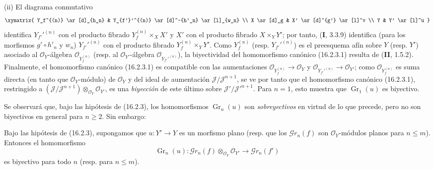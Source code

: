 \noindent(ii) El diagrama conmutativo
\[
  \xymatrix{
    Y_f^{(n)} \ar[d]_{h_n}
      & Y_{f'}'^{(n)} \ar[d]^-{h'_n} \ar[l]_{w_n} \\
    X \ar[d]_g
      & X' \ar[d]^{g'} \ar[l]^v \\
    Y
      & Y' \ar[l]^u
  }
\]
identifica $Y_{f'}'^{(n)}$ con el producto fibrado $Y_f^{(n)}\times_X X'$ y $X'$ con el producto fibrado
$X\times_Y Y'$; por tanto, (\textbf I, 3.3.9) identifica (para los morfismos
$g'\circ h'_n$ y $w_n$) $Y_{f'}'^{(n)}$ con el producto fibrado
$Y_f^{(n)}\times_Y Y'$. Como $Y_f^{(n)}$ (resp. $Y_{f'}'^{(n)}$) es el
preesquema afín sobre $Y$ (resp. $Y'$) asociado al
$\mathcal{O}_Y$-álgebra $\mathcal{O}_{Y_f^{(n)}}$ (resp. al
$\mathcal{O}_{Y'}$-álgebra $\mathcal{O}_{Y_{f'}'^{(n)}}$), la biyectividad del
homomorfismo canónico (16.2.3.1) resulta de (\textbf{II}, 1.5.2).
Finalmente, el homomorfismo canónico (16.2.3.1) es compatible con las
aumentaciones
$\mathcal{O}_{Y_f^{(n)}}\to\mathcal{O}_Y$ y
$\mathcal{O}_{Y_{f'}'^{(n)}}\to\mathcal{O}_{Y'}$; como
$\mathcal{O}_{Y_f^{(n)}}$ es suma directa (en tanto que
$\mathcal{O}_Y$-módulo) de $\mathcal{O}_Y$ y del ideal de aumentación
$\mathscr{J}/\mathscr{J}^{n+1}$, se ve por tanto que el homomorfismo canónico
(16.2.3.1), restringido a
$(\mathscr{J}/\mathscr{J}^{n+1})\otimes_{\mathcal{O}_Y}\mathcal{O}_{Y'}$,
es una \emph{biyección} de este último sobre
$\mathscr{J}'/\mathscr{J}'^{n+1}$. Para $n=1$, esto muestra que
$\operatorname{Gr}_1(u)$ es biyectivo.

Se observará que, bajo las hipótesis de (16.2.3), los homomorfismos
$\operatorname{Gr}_n(u)$ son \emph{sobreyectivos} en virtud de lo que precede, pero no
son biyectivos en general para $n\geq 2$. Sin embargo:

\begin{corollary}[16.2.4]
\label{IV.16.2.4}
Bajo las hipótesis de \textup{(16.2.3)}, supongamos que $u:Y'\to Y$ es un morfismo
plano \textup{(resp.} que los $\mathscr{G}r_n(f)$ son $\mathcal{O}_Y$-módulos
planos para $n\leq m$\textup{)}. Entonces el homomorfismo
\[
  \operatorname{Gr}_n(u):
  \mathscr{G}r_n(f)\otimes_{\mathcal{O}_Y}\mathcal{O}_{Y'}
  \longrightarrow\mathscr{G}r_n(f')
\]
es biyectivo para todo $n$ \textup{(resp.} para $n\leq m$\textup{)}.
\end{corollary}

